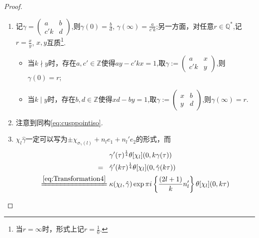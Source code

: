 \begin{proof}\
	\begin{enumerate}[(1)]
		\item 记$\gamma=\left(\begin{smallmatrix}
		a & b \\ c'k & d
		\end{smallmatrix}\right)$,则$\gamma (0)=\frac{b}{d}$, $\gamma (\infty)=\frac{a}{c'k}$;另一方面，对任意$r \in \mathbb{Q}^*$,记$r=\frac{x}{y}$, $x,y$互质\footnote{当$r=\infty$时，形式上记$r=\frac{1}{0}$.}.
		\begin{itemize}
			\item 当$k \nmid y$时，存在$a,c' \in \mathbb{Z}$使得$ay-c'kx=1$,取$\gamma:=\left(\begin{smallmatrix}
			a & x \\ c'k & y
			\end{smallmatrix}\right)$,则$\gamma(0)=r$;
			\item 当$k \mid y$时，存在$b,d \in \mathbb{Z}$使得$xd-by=1$,取$\gamma:=\left(\begin{smallmatrix}
			x & b \\ y & d
			\end{smallmatrix}\right)$,则$\gamma(\infty)=r$.
		\end{itemize}
		\item 注意到同构\eqref{eq:cusppointiso}.
		\item $\chi_l \hat{\gamma}$一定可以写为$\pm \chi_{\sigma_{\gamma}(l)}+n_le_1+n_l'e_2$的形式，而
		\begin{equation*}
		\begin{aligned}
		&\gamma'(\tau)^{\frac{1}{4}}\theta[\chi_l](0,k\gamma(\tau ))\hspace{3mm}\\
		=\hspace{3mm}& \hat{\gamma}'(k\tau)^{\frac{1}{4}}\theta[\chi_l](0,\hat{\gamma}(k\tau ))\\
		\xeq[]{\eqref{eq:Transformation4}}\;& \kappa(\chi_l, \hat{\gamma})\exp \pi i \left\{ \frac{(2l+1)}{k}n_l' \right\} \theta[\chi_l](0,k\tau)		\\
		\end{aligned}
		\end{equation*}
	\end{enumerate}
\end{proof}
